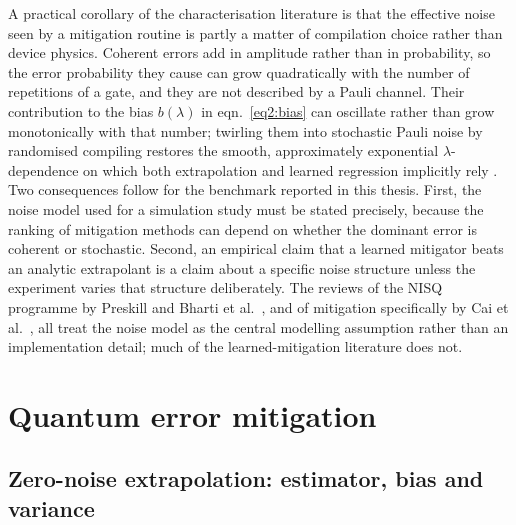 \documentclass[Thesis.tex]{subfiles}
\begin{document}
A practical corollary of the characterisation literature is that the effective
noise seen by a mitigation routine is partly a matter of compilation choice
rather than device physics. Coherent errors add in amplitude rather than in
probability, so the error probability they cause can grow quadratically with the
number of repetitions of a gate, and they are not described by a Pauli channel.
Their contribution to the bias $b(\lambda)$ in eqn.~\eqref{eq2:bias} can
oscillate rather than grow monotonically with that number; twirling them into stochastic Pauli
noise by randomised compiling restores the smooth, approximately exponential
$\lambda$-dependence on which both extrapolation and learned regression
implicitly rely \cite{wallman2016noise}. Two consequences follow for the
benchmark reported in this thesis. First, the noise model used for a simulation
study must be stated precisely, because the ranking of mitigation methods can
depend on whether the dominant error is coherent or stochastic. Second, an
empirical claim that a learned mitigator beats an analytic extrapolant is a
claim about a specific noise structure unless the experiment varies that
structure deliberately. The reviews of the NISQ programme by Preskill
\cite{preskill2018nisq} and Bharti et al.\ \cite{bharti2022noisy}, and of
mitigation specifically by Cai et al.\ \cite{cai2023review}, all treat the
noise model as the central modelling assumption rather than an implementation
detail; much of the learned-mitigation literature does not.

\section{Quantum error mitigation}\label{sec2:qem}

\subsection{Zero-noise extrapolation: estimator, bias and variance}
\end{document}
